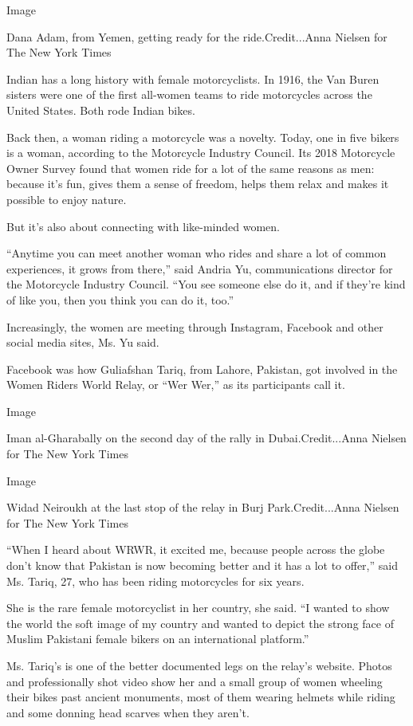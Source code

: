 Image

Dana Adam, from Yemen, getting ready for the ride.Credit...Anna Nielsen
for The New York Times

Indian has a long history with female motorcyclists. In 1916, the Van
Buren sisters were one of the first all-women teams to ride motorcycles
across the United States. Both rode Indian bikes.

Back then, a woman riding a motorcycle was a novelty. Today, one in five
bikers is a woman, according to the Motorcycle Industry Council. Its
2018 Motorcycle Owner Survey found that women ride for a lot of the same
reasons as men: because it's fun, gives them a sense of freedom, helps
them relax and makes it possible to enjoy nature.

But it's also about connecting with like-minded women.

``Anytime you can meet another woman who rides and share a lot of common
experiences, it grows from there,'' said Andria Yu, communications
director for the Motorcycle Industry Council. ``You see someone else do
it, and if they're kind of like you, then you think you can do it,
too.''

Increasingly, the women are meeting through Instagram, Facebook and
other social media sites, Ms. Yu said.

Facebook was how Guliafshan Tariq, from Lahore, Pakistan, got involved
in the Women Riders World Relay, or ``Wer Wer,'' as its participants
call it.

Image

Iman al-Gharabally on the second day of the rally in Dubai.Credit...Anna
Nielsen for The New York Times

Image

Widad Neiroukh at the last stop of the relay in Burj Park.Credit...Anna
Nielsen for The New York Times

``When I heard about WRWR, it excited me, because people across the
globe don't know that Pakistan is now becoming better and it has a lot
to offer,'' said Ms. Tariq, 27, who has been riding motorcycles for six
years.

She is the rare female motorcyclist in her country, she said. ``I wanted
to show the world the soft image of my country and wanted to depict the
strong face of Muslim Pakistani female bikers on an international
platform.''

Ms. Tariq's is one of the better documented legs on the relay's website.
Photos and professionally shot video show her and a small group of women
wheeling their bikes past ancient monuments, most of them wearing
helmets while riding and some donning head scarves when they aren't.

